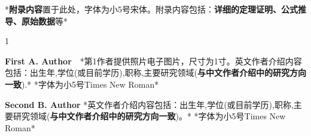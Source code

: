 \documentclass[10.5pt,compsoc,UTF8]{CjC}
\theoremstyle{mystyle}
\begin{document}





\vspace {10mm}

{\setlength\parindent{2em}
*\textbf{附录内容}置于此处，字体为小5号宋体。附录内容包括：\textbf{详细的定理证明、公式推导、原始数据}等*}







\newpage

\begin{multicols}{1}
\begin{biography}
\noindent
\textbf{First A. Author}\ \ *第1作者提供照片电子图片，尺寸为1寸。英文作者介绍内容包括：出生年,学位(或目前学历),职称,主要研究领域(\textbf{与中文作者介绍中的研究方向一致}).*
*字体为小5号Times New Roman*
\end{biography}

\begin{biography}
\noindent
\textbf{Second B. Author} *英文作者介绍内容包括：出生年,学位(或目前学历),职称,主要研究领域(\textbf{与中文作者介绍中的研究方向一致})。*
*字体为小5号Times New Roman*
\end{biography}
\end{multicols}











\end{document}
